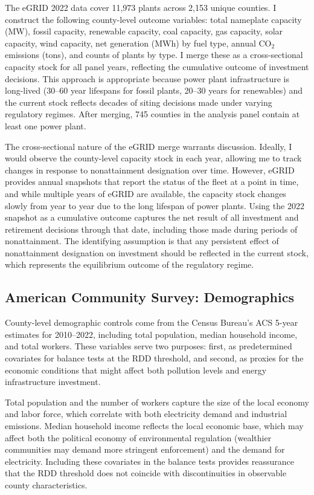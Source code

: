 \documentclass[12pt]{article}
\begin{document}
The eGRID 2022 data cover 11,973 plants across 2,153 unique counties. I construct the following county-level outcome variables: total nameplate capacity (MW), fossil capacity, renewable capacity, coal capacity, gas capacity, solar capacity, wind capacity, net generation (MWh) by fuel type, annual CO$_2$ emissions (tons), and counts of plants by type. I merge these as a cross-sectional capacity stock for all panel years, reflecting the cumulative outcome of investment decisions. This approach is appropriate because power plant infrastructure is long-lived (30--60 year lifespans for fossil plants, 20--30 years for renewables) and the current stock reflects decades of siting decisions made under varying regulatory regimes. After merging, 745 counties in the analysis panel contain at least one power plant.

The cross-sectional nature of the eGRID merge warrants discussion. Ideally, I would observe the county-level capacity stock in each year, allowing me to track changes in response to nonattainment designation over time. However, eGRID provides annual snapshots that report the status of the fleet at a point in time, and while multiple years of eGRID are available, the capacity stock changes slowly from year to year due to the long lifespan of power plants. Using the 2022 snapshot as a cumulative outcome captures the net result of all investment and retirement decisions through that date, including those made during periods of nonattainment. The identifying assumption is that any persistent effect of nonattainment designation on investment should be reflected in the current stock, which represents the equilibrium outcome of the regulatory regime.

\subsection{American Community Survey: Demographics}

County-level demographic controls come from the Census Bureau's ACS 5-year estimates for 2010--2022, including total population, median household income, and total workers. These variables serve two purposes: first, as predetermined covariates for balance tests at the RDD threshold, and second, as proxies for the economic conditions that might affect both pollution levels and energy infrastructure investment.

Total population and the number of workers capture the size of the local economy and labor force, which correlate with both electricity demand and industrial emissions. Median household income reflects the local economic base, which may affect both the political economy of environmental regulation (wealthier communities may demand more stringent enforcement) and the demand for electricity. Including these covariates in the balance tests provides reassurance that the RDD threshold does not coincide with discontinuities in observable county characteristics.
\end{document}
